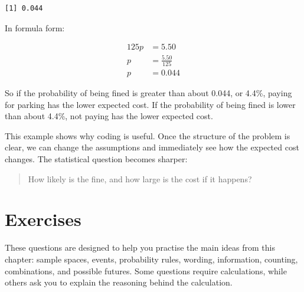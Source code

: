 \documentclass[
  letterpaper,
  DIV=11,
  numbers=noendperiod]{scrreprt}
\begin{document}
\begin{verbatim}
[1] 0.044
\end{verbatim}

In formula form:

\[
\begin{aligned}
125p &= 5.50 \\
p &= \frac{5.50}{125} \\
p &= 0.044
\end{aligned}
\]

So if the probability of being fined is greater than about 0.044, or
4.4\%, paying for parking has the lower expected cost. If the
probability of being fined is lower than about 4.4\%, not paying has the
lower expected cost.

\begin{table}

\caption{\label{tbl-parking-break-even}Break-even probability for the
campus parking example}


\end{table}%

This example shows why coding is useful. Once the structure of the
problem is clear, we can change the assumptions and immediately see how
the expected cost changes. The statistical question becomes sharper:

\begin{quote}
How likely is the fine, and how large is the cost if it happens?
\end{quote}

\section{Exercises}\label{exercises-1}

These questions are designed to help you practise the main ideas from
this chapter: sample spaces, events, probability rules, wording,
information, counting, combinations, and possible futures. Some
questions require calculations, while others ask you to explain the
reasoning behind the calculation.
\end{document}
